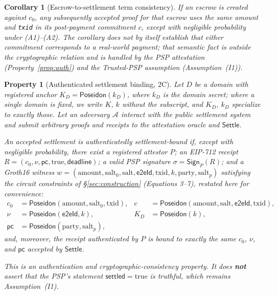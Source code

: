 \documentclass[11pt]{article}
\newtheorem{property}{Property}
\newtheorem{corollary}{Corollary}
\newcommand{\Poseidon}{\ensuremath{\mathsf{Poseidon}}}
\newcommand{\eeid}{\ensuremath{\mathsf{e2eId}}}
\newcommand{\code}[1]{\texttt{#1}}
\begin{document}
\begin{corollary}[Escrow-to-settlement term consistency]
\label{cor:escrowconsistency}
If an escrow is created against $c_0$, any subsequently accepted proof for that
escrow uses the same amount and \code{txid} in its post-payment commitment $c$,
except with negligible probability under (A1)--(A2). The corollary does not by
itself establish that either commitment corresponds to a real-world payment;
that semantic fact is outside the cryptographic relation and is handled by the
PSP attestation (Property~\ref{prop:auth}) and the Trusted-PSP assumption
(Assumption~(I1)).
\end{corollary}

\begin{property}[Authenticated settlement binding, 2C]
\label{prop:settlementbinding}
Let $D$ be a domain with registered anchor $K_D=\Poseidon(k_D)$, where $k_D$ is
the domain secret; where a single domain is fixed, we write $K$, $k$ without
the subscript, and $K_D$, $k_D$ specialize to exactly those. Let an adversary
$\mathcal{A}$ interact with the public settlement system and submit arbitrary
proofs and receipts to the attestation oracle and $\mathsf{Settle}$.

An accepted settlement is \emph{authenticatedly settlement-bound} if, except
with negligible probability, there exist a registered attestor $P$; an
EIP-712 receipt $R=(c_0,\nu,\mathsf{pc},\mathrm{true},\mathsf{deadline})$; a
valid PSP signature $\sigma=\mathsf{Sign}_P(R)$; and a Groth16 witness
$w=(\text{amount},\text{salt}_0,\text{salt},\eeid,\text{txid},k,\text{party},
\text{salt}_p)$ satisfying the circuit constraints of \S\ref{sec:construction}
(Equations 3--7), restated here for convenience:
\begin{align*}
c_0 &= \Poseidon(\text{amount},\text{salt}_0,\text{txid}), &
c   &= \Poseidon(\text{amount},\text{salt},\eeid,\text{txid}), \\
\nu &= \Poseidon(\eeid,k), &
K_D &= \Poseidon(k), \\
\mathsf{pc} &= \Poseidon(\text{party},\text{salt}_p), & &
\end{align*}
and, moreover, the receipt authenticated by $P$ is bound to exactly the same
$c_0$, $\nu$, and $\mathsf{pc}$ accepted by $\mathsf{Settle}$.

This is an authentication and cryptographic-consistency property. It does
\textbf{not} assert that the PSP's statement $\mathsf{settled}=
\mathrm{true}$ is truthful, which remains Assumption~(I1).
\end{property}
\end{document}
